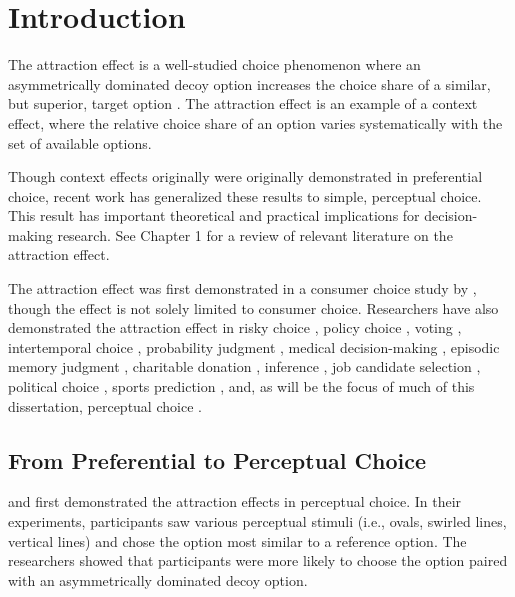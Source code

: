 \section{Introduction}
The attraction effect is a well-studied choice phenomenon where an asymmetrically dominated decoy option increases the choice share of a similar, but superior, target option \parencite{huberAddingAsymmetricallyDominated1982d}. The attraction effect is an example of a context effect, where the relative choice share of an option varies systematically with the set of available options.

Though context effects originally were originally demonstrated in preferential choice, recent work has generalized these results to simple, perceptual choice. This result has important theoretical and practical implications for decision-making research. See Chapter 1 for a review of relevant literature on the attraction effect.

The attraction effect was first demonstrated in a consumer choice study by \textcite{huberAddingAsymmetricallyDominated1982d}, though the effect is not solely limited to consumer choice. Researchers have also demonstrated the attraction effect in risky choice \parencite{mohr2017attraction}, policy choice \parencite{herneDecoyAlternativesPolicy1997b}, voting \parencite{o1995attraction}, intertemporal choice \parencite{mariniAttractionComesMany2020}, probability judgment \parencite{caiWhenAlternativeHypotheses2023,fang2024context}, medical decision-making \parencite{schwartz1999more}, episodic memory judgment \parencite{maylorSimilarityAttractionEffects2007b}, charitable donation \parencite{pittarello2020three}, inference \parencite{truebloodMultialternativeContextEffects2012}, job candidate selection \parencite{highhouseContextDependentSelectionEffects1996}, political choice \parencite{pan1995attractiovoting}, sports prediction \parencite{fang2024context}, and, as will be the focus of much of this dissertation, perceptual choice \parencite{evansImpactPresentationOrder2021,trueblood2013not, trueblood2015fragile, spektorRepulsionEffectPreferential2022,spektorWhenGoodLooks2018b,yearsleyContextEffectsSimilarity2022,turnerCompetingTheoriesMultialternative2018a,liaoInfluenceDistanceDecoy2021}. 

\subsection{From Preferential to Perceptual Choice}

\textcite{choplinComparisoninducedDecoyEffects2005b} and \textcite{yearsleyContextEffectsSimilarity2022} first demonstrated the attraction effects in perceptual choice. In their experiments, participants saw various perceptual stimuli (i.e., ovals, swirled lines, vertical lines) and chose the option most similar to a reference option. The researchers showed that participants were more likely to choose the option paired with an asymmetrically dominated decoy option.

